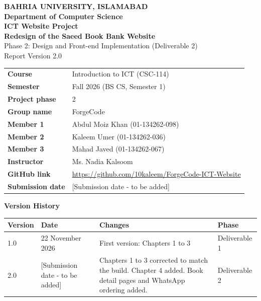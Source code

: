 \documentclass[12pt,a4paper]{article}
\newcommand{\gitlink}{\url{https://github.com/10kaleem/ForgeCode-ICT-Website}}
\newcommand{\subdate}{[Submission date - to be added]}
\begin{document}
\begin{titlepage}
\singlespacing
\centering
{\large\bfseries BAHRIA UNIVERSITY, ISLAMABAD}\\[2pt]
{\bfseries Department of Computer Science}\\[28pt]
{\Large\bfseries ICT Website Project}\\[8pt]
{\large\bfseries Redesign of the Saeed Book Bank Website}\\[10pt]
{\large Phase 2: Design and Front-end Implementation (Deliverable 2)}\\
{\large Report Version 2.0}\\[22pt]

\renewcommand{\arraystretch}{1.5}
\begin{tabular}{@{}>{\bfseries}p{4.2cm}p{9.8cm}@{}}
Course        & Introduction to ICT (CSC-114)\\
Semester      & Fall 2026 (BS CS, Semester 1)\\
Project phase & 2\\
Group name    & ForgeCode\\
Member 1      & Abdul Moiz Khan (01-134262-098)\\
Member 2      & Kaleem Umer (01-134262-036)\\
Member 3      & Mahad Javed (01-134262-067)\\
Instructor    & Ms. Nadia Kalsoom\\
GitHub link   & \gitlink\\
Submission date & \subdate\\
\end{tabular}

\vspace{22pt}
{\bfseries Version History}\\[6pt]
\renewcommand{\arraystretch}{1.3}
\begin{tabular}{|p{1.7cm}|p{3.4cm}|p{6.0cm}|p{2.6cm}|}
\hline
\rowcolor{black!10}\bfseries Version & \bfseries Date & \bfseries Changes & \bfseries Phase\\
\hline
1.0 & 22 November 2026 & First version: Chapters 1 to 3 & Deliverable 1\\
\hline
2.0 & \subdate & Chapters 1 to 3 corrected to match the build. Chapter 4 added. Book detail pages and WhatsApp ordering added. & Deliverable 2\\
\hline
\end{tabular}
\end{titlepage}
\end{document}

